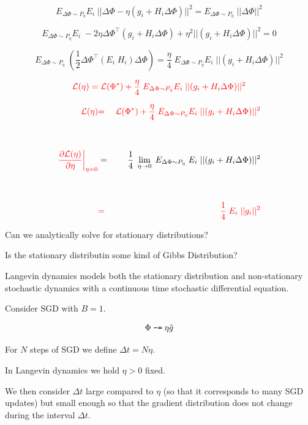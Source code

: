 {$$E_{\Delta \Phi \sim P_\eta}E_i\; ||\Delta \Phi - \eta (g_i + H_i\Delta \Phi)||^2 = E_{\Delta \Phi \sim P_\eta}\; ||\Delta \Phi||^2$$

\vfill
$$E_{\Delta \Phi \sim P_\eta}E_i\;-2\eta \Delta \Phi^\top (g_i + H_i\Delta \Phi) +\eta^2||(g_i + H_i\Delta \Phi)||^2 = 0$$

\vfill
$$E_{\Delta \Phi \sim P_\eta}\;\left(\frac{1}{2}\Delta \Phi^\top (E_i \;H_i)\Delta \Phi\right) = \frac{\eta}{4}\;E_{\Delta \Phi \sim P_\eta}E_i \;||(g_i + H_i\Delta \Phi)||^2$$

\vfill
$${\color{red} {\cal L}(\eta)  = {\cal L}(\Phi^*) + \frac{\eta}{4}\;E_{\Delta \Phi \sim P_\eta}E_i \;||(g_i + H_i\Delta \Phi)||^2}$$


\begin{eqnarray*}
{\color{red} {\cal L}(\eta)}  & {\color{red} =} & {\color{red} {\cal L}(\Phi^*) + \frac{\eta}{4}\;E_{\Delta \Phi \sim P_\eta}E_i \;||(g_i + H_i\Delta \Phi)||^2} \\
\\
\\
{\color{red} \left.\frac{\partial {\cal L}(\eta)}{\partial \eta}\right|_{\eta = 0}} & = & \frac{1}{4} \; \lim_{\eta \rightarrow 0} \; E_{\Delta \Phi \sim P_\eta}\; E_i \;||(g_i + H_i\Delta \Phi)||^2 \\
\\
\\
& {\color{red} =} & {\color{red} \frac{1}{4}\; E_i\;||g_i||^2}
\end{eqnarray*}



Can we analytically solve for stationary distributions?

\vfill
Is the stationary distributin some kind of Gibbs Distribution?

\vfill
Langevin dynamics models both the stationary distribution and non-stationary stochastic dynamics
with {\color{red} a continuous time stochastic differential equation}.



\vfill
Consider SGD with $B = 1$.

$$\Phi \;\mbox{\tt -=}\; \eta\hat{g}$$

\vfill
For $N$ steps of SGD we define $\Delta t = N \eta$.

\vfill
In Langevin dynamics we hold $\eta > 0$ fixed.

\vfill
We then consider $\Delta t$ large compared to $\eta$ (so that it corresponds to many SGD updates) but
small enough so that the gradient distribution does not change during the interval $\Delta t$.

}
